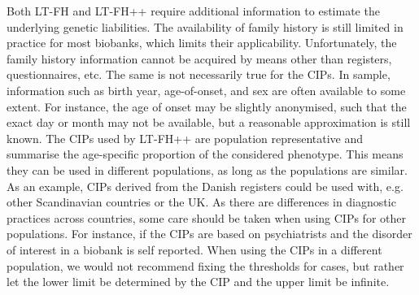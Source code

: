Both LT-FH and LT-FH++ require additional information to estimate the underlying genetic liabilities. The availability of family history is still limited in practice for most biobanks, which limits their applicability. Unfortunately, the family history information cannot be acquired by means other than registers, questionnaires, etc. The same is not necessarily true for the CIPs. In sample, information such as birth year, age-of-onset, and sex are often available to some extent. For instance, the age of onset may be slightly anonymised, such that the exact day or month may not be available, but a reasonable approximation is still known. The CIPs used by LT-FH++ are population representative and summarise the age-specific proportion of the considered phenotype. This means they can be used in different populations, as long as the populations are similar. As an example, CIPs derived from the Danish registers could be used with, e.g. other Scandinavian countries or the UK. As there are differences in diagnostic practices across countries, some care should be taken when using CIPs for other populations. For instance, if the CIPs are based on psychiatrists and the disorder of interest in a biobank is self reported. When using the CIPs in a different population, we would not recommend fixing the thresholds for cases, but rather let the lower limit be determined by the CIP and the upper limit be infinite. 